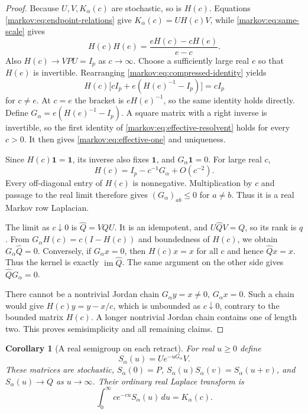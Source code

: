 \documentclass[11pt]{article}
\numberwithin{equation}{section}
\newtheorem{corollary}[theorem]{Corollary}
\theoremstyle{definition}
\theoremstyle{remark}
\newcommand{\one}{\mathbf 1}
\newcommand{\im}{\operatorname{im}}
\begin{document}
\begin{proof}
Because $U,V,K_\alpha(c)$ are stochastic, so is $H(c)$. Equations
\eqref{markov:eq:endpoint-relations} give $K_\alpha(c)=UH(c)V$, while
\eqref{markov:eq:same-scale} gives
\begin{equation}\label{markov:eq:compressed-identity}
 H(c)H(e)=\frac{eH(c)-cH(e)}{e-c}.
\end{equation}
Also $H(c)\to VPU=I_p$ as $c\to\infty$. Choose a sufficiently large real $e$
so that $H(e)$ is invertible. Rearranging \eqref{markov:eq:compressed-identity} yields
\[
 H(c)\bigl[cI_p+e(H(e)^{-1}-I_p)\bigr]=cI_p
\]
for $c\ne e$. At $c=e$ the bracket is $eH(e)^{-1}$, so the same
identity holds directly. Define
$G_\alpha=e(H(e)^{-1}-I_p)$. A square matrix with a right inverse is invertible,
so the first identity of \eqref{markov:eq:effective-resolvent} holds for every $c>0$.
It then gives \eqref{markov:eq:effective-one} and uniqueness.

Since $H(c)\one=\one$, its inverse also fixes $\one$, and $G_\alpha\one=0$.
For large real $c$,
\[
 H(c)=I_p-c^{-1}G_\alpha+O(c^{-2}).
\]
Every off-diagonal entry of $H(c)$ is nonnegative. Multiplication by $c$ and
passage to the real limit therefore gives $(G_\alpha)_{ab}\le0$ for $a\ne b$.
Thus it is a real Markov row Laplacian.

The limit as $c\downarrow0$ is $\widehat Q=VQU$. It is an idempotent, and
$U\widehat QV=Q$, so its rank is $q$. From
$G_\alpha H(c)=c(I-H(c))$ and boundedness of $H(c)$, we obtain
$G_\alpha\widehat Q=0$. Conversely, if $G_\alpha x=0$, then $H(c)x=x$ for
all $c$ and hence $\widehat Qx=x$. Thus the kernel is exactly
$\im\widehat Q$. The same argument on the other side gives
$\widehat QG_\alpha=0$.

There cannot be a nontrivial Jordan chain $G_\alpha y=x\ne0$,
$G_\alpha x=0$. Such a chain would give
$H(c)y=y-x/c$, which is unbounded as $c\downarrow0$, contrary to the bounded
matrix $H(c)$. A longer nontrivial Jordan chain contains one of length two.
This proves semisimplicity and all remaining claims.
\end{proof}

\begin{corollary}[A real semigroup on each retract]\label{markov:cor:effective-semigroup}
For real $u\ge0$ define
\[
 S_\alpha(u)=Ue^{-uG_\alpha}V.
\]
These matrices are stochastic,
$S_\alpha(0)=P$, $S_\alpha(u)S_\alpha(v)=S_\alpha(u+v)$, and
$S_\alpha(u)\to Q$ as $u\to\infty$. Their ordinary real Laplace transform is
\[
 \int_0^\infty c e^{-cu}S_\alpha(u)\,du=K_\alpha(c).
\]
\end{corollary}
\end{document}
